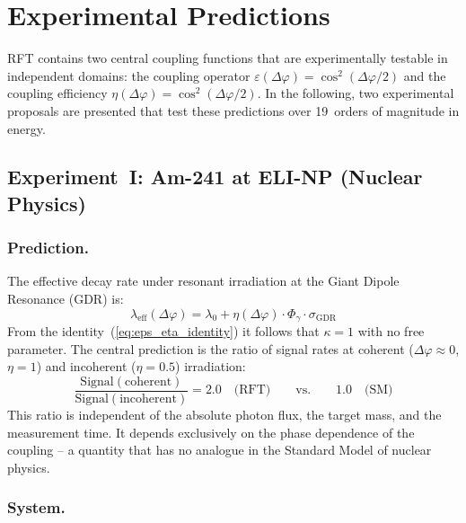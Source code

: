 \documentclass[12pt]{iopart}
\begin{document}
	
	\section{Experimental Predictions}
	\label{sec:experimente}
	
	RFT contains two central coupling functions that are
	experimentally testable in independent domains:
	the coupling operator
	$\varepsilon(\Delta\varphi) = \cos^2(\Delta\varphi/2)$ and
	the coupling efficiency
	$\eta(\Delta\varphi) = \cos^2(\Delta\varphi/2)$. In the
	following, two experimental proposals are presented that
	test these predictions over 19~orders of magnitude in energy.
	
	\subsection{Experiment~I: Am-241 at ELI-NP (Nuclear Physics)}
	\label{sec:exp_am241}
	
	\subsubsection{Prediction.}
	
	The effective decay rate under resonant irradiation at the
	Giant Dipole Resonance (GDR) is:
	\begin{equation}
		\lambda_{\mathrm{eff}}(\Delta\varphi)
		= \lambda_0
		+ \eta(\Delta\varphi) \cdot \Phi_\gamma
		\cdot \sigma_{\mathrm{GDR}}
		\label{eq:lambda_eff_exp}
	\end{equation}
	From the identity~(\ref{eq:eps_eta_identity}) it follows
	that $\kappa = 1$ with no free parameter. The central
	prediction is the ratio of signal rates at coherent
	($\Delta\varphi \approx 0$, $\eta = 1$) and incoherent
	($\eta = 0.5$) irradiation:
	\[
		\frac{\mathrm{Signal}(\text{coherent})}%
		{\mathrm{Signal}(\text{incoherent})} = 2.0
		\quad\text{(RFT)} \qquad\text{vs.}\qquad 1.0
		\quad\text{(SM)}
	\]
	This ratio is independent of the absolute photon flux,
	the target mass, and the measurement time. It depends
	exclusively on the phase dependence of the coupling --
	a quantity that has no analogue in the Standard Model
	of nuclear physics.
	
	\subsubsection{System.}
	
\end{document}
